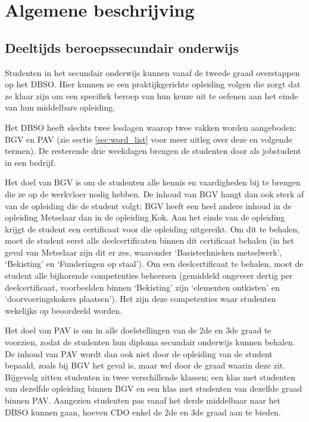 \documentclass[a4paper]{article}
\begin{document}
\newpage
\section{Algemene beschrijving}  \label{sec:general_descr}%
\subsection{Deeltijds beroepssecundair onderwijs}
Studenten in het secundair onderwijs kunnen vanaf de tweede graad overstappen op het DBSO. Hier kunnen ze een praktijkgerichte opleiding volgen die zorgt dat ze klaar zijn om een specifiek beroep van hun keuze uit te oefenen aan het einde van hun middelbare opleiding.

Het DBSO heeft slechts twee lesdagen waarop twee vakken worden aangeboden: BGV en PAV (zie sectie \ref{sec:word_list} voor meer uitleg over deze en volgende termen). De resterende drie weekdagen brengen de studenten door als jobstudent in een bedrijf.

Het doel van BGV is om de studenten alle kennis en vaardigheden bij te brengen die ze op de werkvloer nodig hebben. De inhoud van BGV hangt dan ook sterk af van de opleiding die de student volgt; BGV heeft een heel andere inhoud in de opleiding Metselaar dan in de opleiding Kok. Aan het einde van de opleiding krijgt de student een certificaat voor die opleiding uitgereikt. Om dit te behalen, moet de student eerst alle deelcertificaten binnen dit certificaat behalen (in het geval van Metselaar zijn dit er zes, waaronder `Basistechnieken metselwerk', `Bekisting' en `Funderingen op staal'). Om een deelcertificaat te behalen, moet de student alle bijhorende competenties beheersen (gemiddeld ongeveer dertig per deelcertificaat, voorbeelden binnen `Bekisting' zijn `elementen ontkisten' en `doorvoeringskokers plaatsen'). Het zijn deze competenties waar studenten wekelijks op beoordeeld worden.

Het doel van PAV is om in alle doelstellingen van de 2de en 3de graad te voorzien, zodat de studenten hun diploma secundair onderwijs kunnen behalen. De inhoud van PAV wordt dan ook niet door de opleiding van de student bepaald, zoals bij BGV het geval is, maar wel door de graad waarin deze zit. Bijgevolg zitten studenten in twee verschillende klassen; een klas met studenten van dezelfde opleiding binnen BGV en een klas met studenten van dezelfde graad binnen PAV. Aangezien studenten pas vanaf het derde middelbaar naar het DBSO kunnen gaan, hoeven CDO enkel de 2de en 3de graad aan te bieden.
\end{document}
